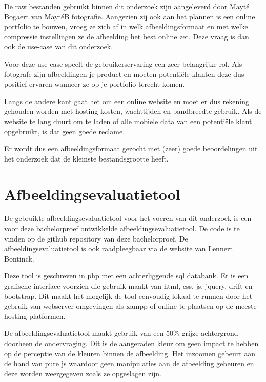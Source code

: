 De \gls{raw} bestanden gebruikt binnen dit onderzoek zijn aangeleverd door Mayté Bogaert van MaytéB fotografie. Aangezien zij ook aan het plannen is een online portfolio te bouwen, vroeg ze zich af in welk \gls{afbeeldingsformaat} en met welke compressie instellingen ze de afbeelding het best online zet. Deze vraag is dan ook de \gls{use-case} van dit onderzoek.

Voor deze \gls{use-case} speelt de gebruikerservaring een zeer belangrijke rol. Als fotografe zijn afbeeldingen je product en moeten potentiële klanten deze dus positief ervaren wanneer ze op je portfolio terecht komen.

Langs de andere kant gaat het om een online website en moet er dus rekening gehouden worden met \gls{hosting} kosten, wachttijden en \gls{bandbreedte} gebruik. Als de website te lang duurt om te laden of alle mobiele data van een potentiële klant opgebruikt, is dat geen goede reclame.

Er wordt dus een \gls{afbeeldingsformaat} gezocht met (zeer) goede beoordelingen uit het onderzoek dat de kleinste bestandsgrootte heeft.

\section{Afbeeldingsevaluatietool}
\label{sec:onderzoek-evaluatietool}

De gebruikte \gls{afbeeldingsevaluatietool} voor het voeren van dit onderzoek is een voor deze bachelorproef ontwikkelde \gls{afbeeldingsevaluatietool}. De code is te vinden op de \gls{github} repository van deze bachelorproef. De \gls{afbeeldingsevaluatietool} is ook raadpleegbaar via de website van Lennert Bontinck.

Deze tool is geschreven in \gls{php} met een achterliggende \gls{sql} databank. Er is een grafische interface voorzien die gebruik maakt van \gls{html}, \gls{css}, \gls{js}, \gls{jquery}, \gls{drift} en \gls{bootstrap}. Dit maakt het mogelijk de tool eenvoudig lokaal te runnen door het gebruik van webserver omgevingen als \gls{xampp} of online te plaatsen op de meeste \gls{hosting} platformen.

De \gls{afbeeldingsevaluatietool} maakt gebruik van een 50\% grijze achtergrond doorheen de ondervraging. Dit is de aangeraden kleur om geen impact te hebben op de perceptie van de kleuren binnen de afbeelding. Het inzoomen gebeurt aan de hand van pure \gls{js} waardoor geen manipulaties aan de afbeelding gebeuren en deze worden weergegeven zoals ze opgeslagen zijn. 

